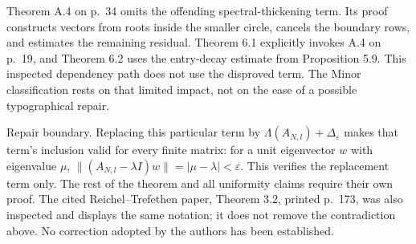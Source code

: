 \documentclass[10pt]{article}
\begin{document}
Theorem A.4 on p. 34 omits the offending spectral-thickening term. Its proof constructs vectors from roots inside the smaller circle, cancels the boundary rows, and estimates the remaining residual. Theorem 6.1 explicitly invokes A.4 on p. 19, and Theorem 6.2 uses the entry-decay estimate from Proposition 5.9. This inspected dependency path does not use the disproved term. The Minor classification rests on that limited impact, not on the ease of a possible typographical repair.\par
Repair boundary. Replacing this particular term by \(\Lambda(A_{N,l})+\Delta_\varepsilon\) makes that term’s inclusion valid for every finite matrix: for a unit eigenvector \(w\) with eigenvalue \(\mu\), \(\|(A_{N,l}-\lambda I)w\|=|\mu-\lambda|<\varepsilon\). This verifies the replacement term only. The rest of the theorem and all uniformity claims require their own proof. The cited Reichel–Trefethen paper, Theorem 3.2, printed p. 173, was also inspected and displays the same notation; it does not remove the contradiction above. No correction adopted by the authors has been established.\par
\end{document}
